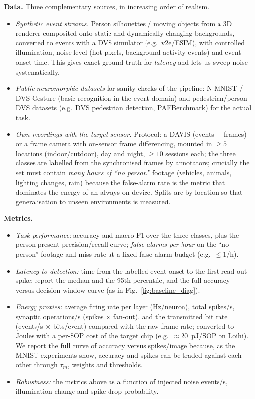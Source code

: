 \documentclass[11pt,a4paper]{article}
\begin{document}
\textbf{Data.} Three complementary sources, in increasing order of realism.
\begin{itemize}
\item \emph{Synthetic event streams.} Person silhouettes / moving objects from a 3D renderer composited onto static and dynamically changing backgrounds, converted to events with a DVS simulator (e.g.\ v2e/ESIM), with controlled illumination, noise level (hot pixels, background activity events) and event onset time. This gives exact ground truth for \emph{latency} and lets us sweep noise systematically.
\item \emph{Public neuromorphic datasets} for sanity checks of the pipeline: N-MNIST / DVS-Gesture (basic recognition in the event domain) and pedestrian/person DVS datasets (e.g.\ DVS pedestrian detection, PAFBenchmark) for the actual task.
\item \emph{Own recordings with the target sensor.} Protocol: a DAVIS (events + frames) or a frame camera with on-sensor frame differencing, mounted in $\ge 5$ locations (indoor/outdoor), day and night, $\ge 10$ sessions each; the three classes are labelled from the synchronised frames by annotators; crucially the set must contain \emph{many hours of ``no person''} footage (vehicles, animals, lighting changes, rain) because the false-alarm rate is the metric that dominates the energy of an always-on device. Splits are by location so that generalisation to unseen environments is measured.
\end{itemize}

\textbf{Metrics.}
\begin{itemize}
\item \emph{Task performance:} accuracy and macro-F1 over the three classes, plus the person-present precision/recall curve; \emph{false alarms per hour} on the ``no person'' footage and miss rate at a fixed false-alarm budget (e.g.\ $\le 1$/h).
\item \emph{Latency to detection:} time from the labelled event onset to the first read-out spike; report the median and the 95th percentile, and the full accuracy-versus-decision-window curve (as in Fig.~\ref{fig:baseline_diag}).
\item \emph{Energy proxies:} average firing rate per layer (Hz/neuron), total spikes/s, synaptic operations/s (spikes $\times$ fan-out), and the transmitted bit rate (events/s $\times$ bits/event) compared with the raw-frame rate; converted to Joules with a per-SOP cost of the target chip (e.g.\ $\approx 20$~pJ/SOP on Loihi). We report the full curve of accuracy versus spikes/image because, as the MNIST experiments show, accuracy and spikes can be traded against each other through $\tau_m$, weights and thresholds.
\item \emph{Robustness:} the metrics above as a function of injected noise events/s, illumination change and spike-drop probability.
\end{itemize}
\end{document}
